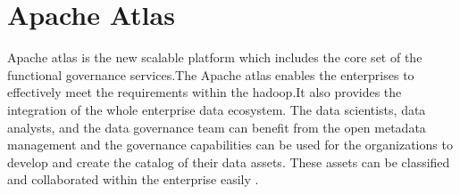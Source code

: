 \section{Apache Atlas}
Apache atlas is the new scalable platform which includes the core set of the 
functional governance services.The Apache atlas enables the enterprises to 
effectively meet the requirements within the hadoop.It also provides the 
integration of the whole enterprise data ecosystem. The data scientists, 
data analysts, and the data governance team can benefit from the open metadata
 management and the governance capabilities can be used for the organizations
 to develop and create the catalog of their data assets. These assets can be 
classified and collaborated within the enterprise easily 
\cite{hid-sp18-412-Apache_Atlas_by_Maven}.

